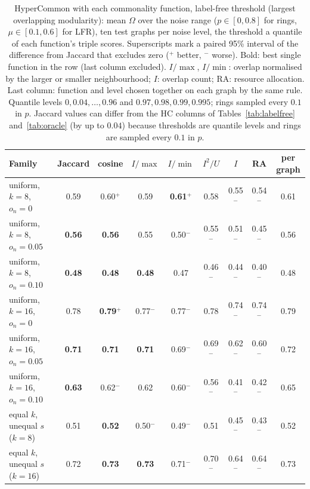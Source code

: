 \begin{table}[t]
\caption{HyperCommon with each commonality function, label-free threshold (largest overlapping modularity): mean $\Omega$ over the noise range ($p\in[0,0.8]$ for rings, $\mu\in[0.1,0.6]$ for LFR), ten test graphs per noise level, the threshold a quantile of each function's triple scores. Superscripts mark a paired 95\% interval of the difference from Jaccard that excludes zero ($^+$ better, $^-$ worse). Bold: best single function in the row (last column excluded). $I/\max$, $I/\min$: overlap normalised by the larger or smaller neighbourhood; $I$: overlap count; RA: resource allocation. Last column: function and level chosen together on each graph by the same rule. Quantile levels $0,0.04,\dots,0.96$ and $0.97,0.98,0.99,0.995$; rings sampled every $0.1$ in $p$. Jaccard values can differ from the HC columns of Tables~\ref{tab:labelfree} and~\ref{tab:oracle} (by up to $0.04$) because thresholds are quantile levels and rings are sampled every $0.1$ in $p$.}
\label{tab:familyfree}
\scriptsize
\begin{ruledtabular}
\begin{tabular}{lccccccc|c}
Family & Jaccard & cosine & $I/\max$ & $I/\min$ & $I^2/U$ & $I$ & RA & per graph \\
\hline
uniform, $k{=}8$, $o_n{=}0$ & 0.59 & 0.60$^+$ & 0.59 & \textbf{0.61$^+$} & 0.58 & 0.55$^-$ & 0.54$^-$ & 0.61 \\
uniform, $k{=}8$, $o_n{=}0.05$ & \textbf{0.56} & \textbf{0.56} & 0.55 & 0.50$^-$ & 0.55$^-$ & 0.51$^-$ & 0.45$^-$ & 0.56 \\
uniform, $k{=}8$, $o_n{=}0.10$ & \textbf{0.48} & \textbf{0.48} & \textbf{0.48} & 0.47 & 0.46$^-$ & 0.44$^-$ & 0.40$^-$ & 0.48 \\
uniform, $k{=}16$, $o_n{=}0$ & 0.78 & \textbf{0.79$^+$} & 0.77$^-$ & 0.77$^-$ & 0.78 & 0.74$^-$ & 0.74$^-$ & 0.79 \\
uniform, $k{=}16$, $o_n{=}0.05$ & \textbf{0.71} & \textbf{0.71} & \textbf{0.71} & 0.69$^-$ & 0.69$^-$ & 0.62$^-$ & 0.60$^-$ & 0.72 \\
uniform, $k{=}16$, $o_n{=}0.10$ & \textbf{0.63} & 0.62$^-$ & 0.62 & 0.60$^-$ & 0.56$^-$ & 0.41$^-$ & 0.42$^-$ & 0.65 \\
equal $k$, unequal $s$ ($k{=}8$) & 0.51 & \textbf{0.52} & 0.50$^-$ & 0.49$^-$ & 0.51 & 0.45$^-$ & 0.43$^-$ & 0.52 \\
equal $k$, unequal $s$ ($k{=}16$) & 0.72 & \textbf{0.73} & \textbf{0.73} & 0.71$^-$ & 0.70$^-$ & 0.64$^-$ & 0.64$^-$ & 0.73 \\

\end{tabular}
\end{ruledtabular}
\end{table}
